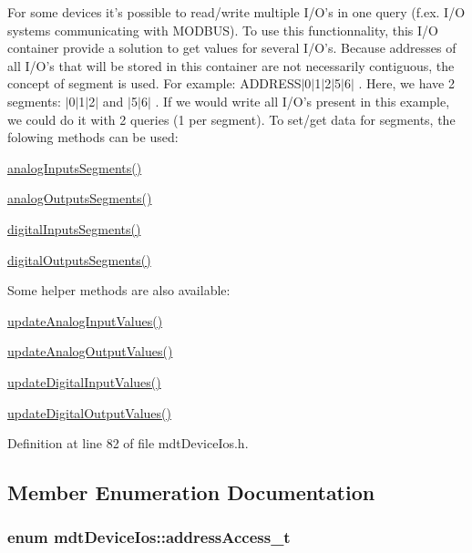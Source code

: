 For some devices it's possible to read/write multiple I/O's in one query (f.ex. I/O systems communicating with MODBUS). To use this functionnality, this I/O container provide a solution to get values for several I/O's. Because addresses of all I/O's that will be stored in this container are not necessarily contiguous, the concept of segment is used. For example: ADDRESS$|$0$|$1$|$2$|$5$|$6$|$ . Here, we have 2 segments: $|$0$|$1$|$2$|$ and $|$5$|$6$|$ . If we would write all I/O's present in this example, we could do it with 2 queries (1 per segment). To set/get data for segments, the folowing methods can be used:
\begin{DoxyItemize}
\item \hyperlink{classmdt_device_ios_a71a1b9cdbc524e4d0094ab37575defc1}{analogInputsSegments()}
\item \hyperlink{classmdt_device_ios_afc425a36dd8942a507d993993bc141a9}{analogOutputsSegments()}
\item \hyperlink{classmdt_device_ios_adc81519c2e6edc7fe54663c77d6eb503}{digitalInputsSegments()}
\item \hyperlink{classmdt_device_ios_ad2b06fe61d71150ac57d77e9bfc7894b}{digitalOutputsSegments()}
\end{DoxyItemize}

Some helper methods are also available:
\begin{DoxyItemize}
\item \hyperlink{classmdt_device_ios_addeff0a2dab646a49170f8be10cc46fb}{updateAnalogInputValues()}
\item \hyperlink{classmdt_device_ios_a3aee92ecadda601d9482aeb6419f0bb8}{updateAnalogOutputValues()}
\item \hyperlink{classmdt_device_ios_ae994a3ef4d4f101ac185308e4afc05cb}{updateDigitalInputValues()}
\item \hyperlink{classmdt_device_ios_a06642814dbbb525dff7d1a7e603f57ac}{updateDigitalOutputValues()} 
\end{DoxyItemize}

Definition at line 82 of file mdtDeviceIos.h.



\subsection{Member Enumeration Documentation}
\hypertarget{classmdt_device_ios_a72fc3fdcd905d669b1e90496e808d6dd}{
\subsubsection[{addressAccess\_\-t}]{\setlength{\rightskip}{0pt plus 5cm}enum {\bf mdtDeviceIos::addressAccess\_\-t}}}
\label{classmdt_device_ios_a72fc3fdcd905d669b1e90496e808d6dd}


